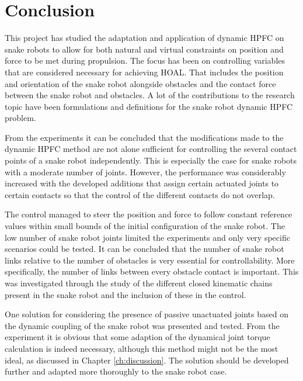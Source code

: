 \chapter{Conclusion}\label{ch:conclusion}

This project has studied the adaptation and application of dynamic HPFC on snake robots to allow for both natural and virtual constraints on position and force to be met during propulsion. The focus has been on controlling variables that are considered necessary for achieving HOAL. That includes the position and orientation of the snake robot alongside obstacles and the contact force between the snake robot and obstacles. A lot of the contributions to the research topic have been formulations and definitions for the snake robot dynamic HPFC problem.

From the experiments it can be concluded that the modifications made to the dynamic HPFC method are not alone sufficient for controlling the several contact points of a snake robot independently. This is especially the case for snake robots with a moderate number of joints. However, the performance was considerably increased with the developed additions that assign certain actuated joints to certain contacts so that the control of the different contacts do not overlap.


The control managed to steer the position and force to follow constant reference values within small bounds of the initial configuration of the snake robot. The low number of snake robot joints limited the experiments and only very specific scenarios could be tested. It can be concluded that the number of snake robot links relative to the number of obstacles is very essential for controllability. More specifically, the number of links between every obstacle contact is important. This was investigated through the study of the different closed kinematic chains present in the snake robot and the inclusion of these in the control.

One solution for considering the presence of passive unactuated joints based on the dynamic coupling of the snake robot was presented and tested. From the experiment it is obvious that some adaption of the dynamical joint torque calculation is indeed necessary, although this method might not be the most ideal, as discussed in Chapter \ref{ch:discussion}. The solution should be developed further and adapted more thoroughly to the snake robot case.

